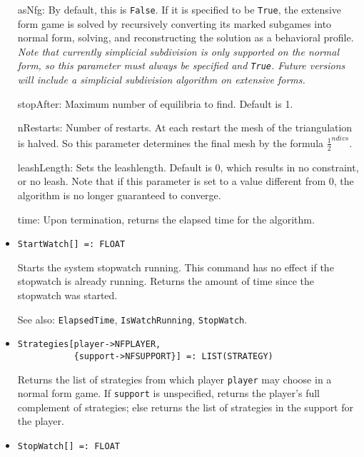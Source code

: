 \begin{itemize}
\bd
\item
[asNfg:] By default, this is \verb+False+.  If it is specified to be
\verb+True+, the extensive form game is solved by recursively converting
its marked subgames into normal form, solving, and reconstructing the
solution as a behavioral profile.  {\it Note that currently simplicial
subdivision is only supported on the normal form, so this parameter
must always be specified and {\tt True}.  Future versions will include
a simplicial subdivision algorithm on extensive forms.}
\item
[stopAfter:] Maximum number of equilibria to find. Default is 1.  
\item 
[nRestarts:] Number of restarts.  At each restart the mesh of the
triangulation is halved.  So this parameter determines the final mesh
by the formula $\frac{1}{2}^{ndivs}$.
\item
[leashLength:] Sets the leashlength. Default is 0, which results in no
constraint, or no leash.  Note that if this parameter is set to a value
different from 0, the algorithm is no longer guaranteed to converge.
\item
[time:] Upon termination, returns the elapsed time for the algorithm.
\ed
\ed

\item
\protect \large \begin{verbatim}
StartWatch[] =: FLOAT
\end{verbatim}\normalsize

\bd Starts the system stopwatch running.  This command has no
effect if the stopwatch is already running.
Returns the amount of time since the stopwatch was started.
\item
[See also:] {\tt ElapsedTime}, {\tt IsWatchRunning}, {\tt StopWatch}.
\ed

\item
\protect \large \begin{verbatim}
Strategies[player->NFPLAYER, 
           {support->NFSUPPORT}] =: LIST(STRATEGY)
\end{verbatim}\normalsize

\bd
Returns the list of strategies from which player \verb+player+ may choose
in a normal form game.  If \verb+support+ is unspecified, returns the
player's full complement of strategies; else returns the list of strategies
in the support for the player.
\ed

\item
\protect \large \begin{verbatim}
StopWatch[] =: FLOAT
\end{verbatim}\normalsize


\end{itemize}
